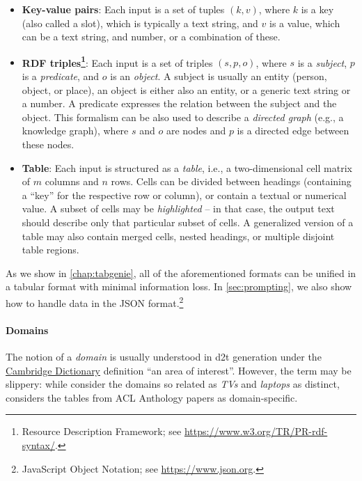 \begin{itemize}
    \item \textbf{Key-value pairs}: Each input is a set of tuples $(k, v)$, where $k$ is a key (also called a slot), which is typically a text string, and $v$ is a value, which can be a text string, and number, or a combination of these.
    \item \textbf{RDF triples\footnote{Resource Description Framework; see \url{https://www.w3.org/TR/PR-rdf-syntax/}.}}: Each input is a set of triples $(s, p, o)$, where $s$ is a \emph{subject},  $p$ is a \emph{predicate}, and $o$ is an \textit{object}. A subject is usually an entity (person, object, or place), an object is either also an entity, or a generic text string or a number. A predicate expresses the relation between the subject and the object. This formalism can be also used to describe a \emph{directed graph} (e.g., a knowledge graph), where $s$ and $o$ are nodes and $p$ is a directed edge between these nodes.
    \item \textbf{Table}: Each input is structured as a \textit{table}, i.e., a two-dimensional cell matrix of $m$ columns and $n$ rows. Cells can be divided between headings (containing a ``key'' for the respective row or column), or contain a textual or numerical value. A subset of cells may be \emph{highlighted } -- in that case, the output text should describe only that particular subset of cells. A generalized version of a table may also contain merged cells, nested headings, or multiple disjoint table regions.
\end{itemize}

As we show in \autoref{chap:tabgenie}, all of the aforementioned formats can be unified in a tabular format with minimal information loss. In \autoref{sec:prompting}, we also show how to handle data in the JSON format.\footnote{JavaScript Object Notation; see \url{https://www.json.org}.}

\paragraph{Domains} The notion of a \emph{domain} is usually understood in \ac{d2t} generation under the \href{https://dictionary.cambridge.org/dictionary/english/domain}{Cambridge Dictionary} definition ``an area of interest''. However, the term may be slippery: while \citet{wen2016multi} consider the domains so related as \emph{TVs} and \emph{laptops} as distinct, \citet{lin2023survey} considers the tables from ACL Anthology papers \cite{suadaaTabletoTextGenerationNumerical2021} as domain-specific.

